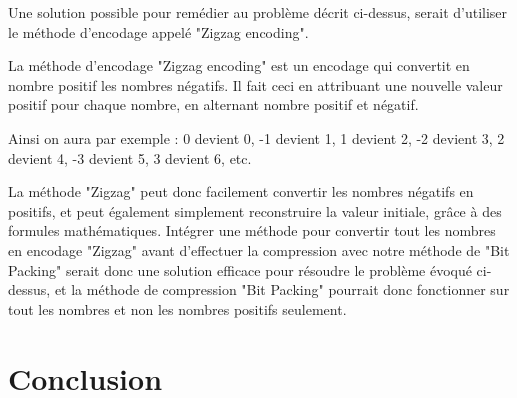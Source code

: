 \documentclass[titlepage]{article}
\begin{document}
Une solution possible pour remédier au problème décrit ci-dessus, serait d'utiliser le méthode d'encodage appelé "Zigzag encoding".
\par La méthode d'encodage "Zigzag encoding" est un encodage qui convertit en nombre positif les nombres négatifs. Il fait ceci en attribuant une nouvelle valeur positif pour chaque nombre, en alternant nombre positif et négatif.
\par Ainsi on aura par exemple : 0 devient 0, -1 devient 1, 1 devient 2, -2 devient 3, 2 devient 4, -3 devient 5, 3 devient 6, etc.
\par La méthode "Zigzag" peut donc facilement convertir les nombres négatifs en positifs, et peut également simplement reconstruire la valeur initiale, grâce à des formules mathématiques. Intégrer une méthode pour convertir tout les nombres en encodage "Zigzag" avant d'effectuer la compression avec notre méthode de "Bit Packing" serait donc une solution efficace pour résoudre le problème évoqué ci-dessus, et la méthode de compression "Bit Packing" pourrait donc fonctionner sur tout les nombres et non les nombres positifs seulement. 

\clearpage


\section{Conclusion}
\end{document}
